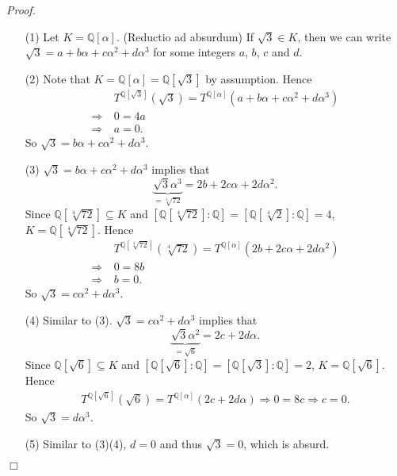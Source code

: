 \documentclass{article}
\begin{document}
\emph{Proof.}
\begin{enumerate}
\item[(1)]
  Let $K = \mathbb{Q}[\alpha]$.
  (Reductio ad absurdum)
  If $\sqrt{3} \in K$, then we can write $\sqrt{3} = a + b\alpha + c\alpha^2 + d\alpha^3$
  for some integers $a$, $b$, $c$ and $d$.

\item[(2)]
  Note that $K = \mathbb{Q}[\alpha] = \mathbb{Q}[\sqrt{3}]$ by assumption.
  Hence
  \begin{align*}
    & \: T^{\mathbb{Q}[\sqrt{3}]}(\sqrt{3})
        = T^{\mathbb{Q}[\alpha]}(a + b\alpha + c\alpha^2 + d\alpha^3) \\
    \Longrightarrow & \:
        0 = 4a \\
    \Longrightarrow & \:
        a = 0.
  \end{align*}
  So $\sqrt{3} = b\alpha + c\alpha^2 + d\alpha^3$.

\item[(3)]
  $\sqrt{3} = b\alpha + c\alpha^2 + d\alpha^3$ implies that
  \[
    \underbrace{\sqrt{3}\alpha^3}_{= \sqrt[4]{72}} = 2b + 2c\alpha + 2d\alpha^2.
  \]
  Since $\mathbb{Q}[\sqrt[4]{72}] \subseteq K$
  and $[\mathbb{Q}[\sqrt[4]{72}]:\mathbb{Q}] = [\mathbb{Q}[\sqrt[4]{2}]:\mathbb{Q}] = 4$,
  $K = \mathbb{Q}[\sqrt[4]{72}]$.
  Hence
  \begin{align*}
    & \: T^{\mathbb{Q}[\sqrt[4]{72}]}(\sqrt[4]{72})
        = T^{\mathbb{Q}[\alpha]}(2b + 2c\alpha + 2d\alpha^2) \\
    \Longrightarrow & \:
        0 = 8b \\
    \Longrightarrow & \:
        b = 0.
  \end{align*}
  So $\sqrt{3} = c\alpha^2 + d\alpha^3$.

\item[(4)]
  Similar to (3).
  $\sqrt{3} = c\alpha^2 + d\alpha^3$ implies that
  \[
    \underbrace{\sqrt{3}\alpha^2}_{= \sqrt{6}} = 2c + 2d\alpha.
  \]
  Since $\mathbb{Q}[\sqrt{6}] \subseteq K$
  and $[\mathbb{Q}[\sqrt{6}]:\mathbb{Q}] = [\mathbb{Q}[\sqrt{3}]:\mathbb{Q}] = 2$,
  $K = \mathbb{Q}[\sqrt{6}]$.
  Hence
  \begin{align*}
    T^{\mathbb{Q}[\sqrt{6}]}(\sqrt{6})
        = T^{\mathbb{Q}[\alpha]}(2c + 2d\alpha)
    \Longrightarrow
        0 = 8c
    \Longrightarrow
        c = 0.
  \end{align*}
  So $\sqrt{3} = d\alpha^3$.

\item[(5)]
  Similar to (3)(4), $d = 0$ and thus $\sqrt{3} = 0$, which is absurd.
\end{enumerate}
$\Box$ \\
\end{document}
